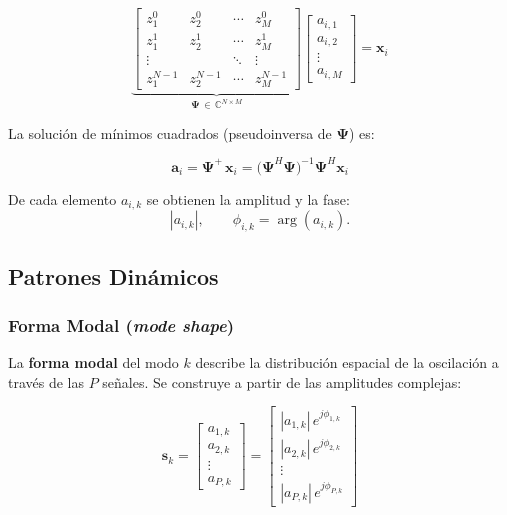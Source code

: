 \begin{equation}
    \underbrace{
    \begin{bmatrix}
        z_1^0 & z_2^0 & \cdots & z_M^0 \\
        z_1^1 & z_2^1 & \cdots & z_M^1 \\
        \vdots &      & \ddots & \vdots \\
        z_1^{N-1} & z_2^{N-1} & \cdots & z_M^{N-1}
    \end{bmatrix}
    }_{\boldsymbol{\Psi}\,\in\,\mathbb{C}^{N \times M}}
    \begin{bmatrix} a_{i,1} \\ a_{i,2} \\ \vdots \\ a_{i,M} \end{bmatrix}
    = \mathbf{x}_i
    \label{eq:vander_art}
\end{equation}

    
La solución de mínimos cuadrados (pseudoinversa de $\boldsymbol{\Psi}$) es:

\begin{equation}
    \mathbf{a}_i = \boldsymbol{\Psi}^+\,\mathbf{x}_i
    = \bigl(\boldsymbol{\Psi}^H\boldsymbol{\Psi}\bigr)^{-1}\boldsymbol{\Psi}^H\mathbf{x}_i
    \label{eq:residues_art}
\end{equation}

De cada elemento $a_{i,k}$ se obtienen la amplitud y la fase:
\[
|a_{i,k}|,\qquad \phi_{i,k} = \arg(a_{i,k}).
\]

\subsection{Patrones Dinámicos}
\subsubsection{Forma Modal (\textit{mode shape})}

La \textbf{forma modal} del modo $k$ describe la distribución espacial de la oscilación
a través de las $P$ señales. Se construye a partir de las amplitudes complejas:

\begin{equation}
    \mathbf{s}_k =
    \begin{bmatrix}
        a_{1,k} \\
        a_{2,k} \\
        \vdots \\
        a_{P,k}
    \end{bmatrix}
    =
    \begin{bmatrix}
        |a_{1,k}|\,e^{j\phi_{1,k}} \\
        |a_{2,k}|\,e^{j\phi_{2,k}} \\
        \vdots \\
        |a_{P,k}|\,e^{j\phi_{P,k}}
    \end{bmatrix}
    \label{eq:mode_shape_art}
\end{equation}

